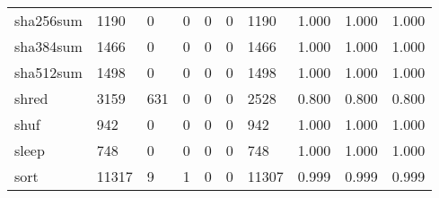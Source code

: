 \begin{longtable}{lp{1.3cm}p{1.3cm}p{1.3cm}p{1.3cm}p{1.3cm}p{1.3cm}p{1.3cm}p{1.3cm}p{1.3cm}}
sha256sum &                   1190 &                                  0 &                                 0 &                                0 &                                 0 &                            1190 &                                1.000 &                                  1.000 &                                1.000 \\
sha384sum &                   1466 &                                  0 &                                 0 &                                0 &                                 0 &                            1466 &                                1.000 &                                  1.000 &                                1.000 \\
sha512sum &                   1498 &                                  0 &                                 0 &                                0 &                                 0 &                            1498 &                                1.000 &                                  1.000 &                                1.000 \\
shred     &                   3159 &                                631 &                                 0 &                                0 &                                 0 &                            2528 &                                0.800 &                                  0.800 &                                0.800 \\
shuf      &                    942 &                                  0 &                                 0 &                                0 &                                 0 &                             942 &                                1.000 &                                  1.000 &                                1.000 \\
sleep     &                    748 &                                  0 &                                 0 &                                0 &                                 0 &                             748 &                                1.000 &                                  1.000 &                                1.000 \\
sort      &                  11317 &                                  9 &                                 1 &                                0 &                                 0 &                           11307 &                                0.999 &                                  0.999 &                                0.999 \\

\end{longtable}
